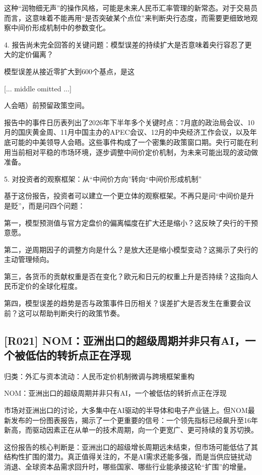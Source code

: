 \documentclass[11pt]{ctexart}
\begin{document}
这种“润物细无声”的操作风格，可能是未来人民币汇率管理的新常态。对于交易员而言，这意味着不能再用“是否突破某个点位”来判断央行态度，而需要更细致地观察中间价形成机制中的参数变化。

4. 报告尚未完全回答的关键问题：模型误差的持续扩大是否意味着央行容忍了更大的定价偏离？

模型误差从接近零扩大到600个基点，是这

[... middle omitted ...]

人会晤）前预留政策空间。

报告中的事件日历表列出了2026年下半年多个关键时点：7月底的政治局会议、10月的国庆黄金周、11月中国主办的APEC会议、12月的中央经济工作会议，以及年底可能的中美领导人会晤。这些事件构成了一个密集的政策窗口期。央行可能在利用当前相对平稳的市场环境，逐步调整中间价定价机制，为未来可能出现的波动做准备。

5. 对投资者的观察框架：从“中间价方向”转向“中间价形成机制”

基于这份报告，投资者可以建立一个更立体的观察框架。不再只是问“中间价是升是贬”，而是问四个问题：

第一，模型预测值与官方定盘价的偏离幅度在扩大还是缩小？这反映了央行的干预意愿。

第二，逆周期因子的调整方向是什么？是放大还是缩小模型变动？这揭示了央行的主动管理倾向。

第三，各货币的贡献权重是否在变化？欧元和日元的权重上升是否持续？这指向人民币定价的全球化程度。

第四，模型误差的趋势是否与政策事件日历相关？误差扩大是否发生在重要会议前？这可以帮助判断央行的政策节奏。

\subsection{[R021] NOM：亚洲出口的超级周期并非只有AI，一个被低估的转折点正在浮现}
{\small\color{refgray}归类：外汇与资本流动：人民币定价机制微调与跨境框架重构}

NOM：亚洲出口的超级周期并非只有AI，一个被低估的转折点正在浮现

市场对亚洲出口的讨论，大多集中在AI驱动的半导体和电子产业链上。但NOM最新发布的一份图表报告，揭示了一个更重要的信号：一个领先指标已经飙升至16年新高，而驱动因素正在从单一的技术周期，向一个更宽广、更可持续的复苏切换。

这份报告的核心判断是：亚洲出口的超级增长周期远未结束，但市场可能低估了其结构性扩围的潜力。真正值得关注的，不是AI需求还能多强，而是当供应链扰动消退、全球资本品需求回升时，哪些国家、哪些行业能承接这轮“扩围”的增量。
\end{document}
